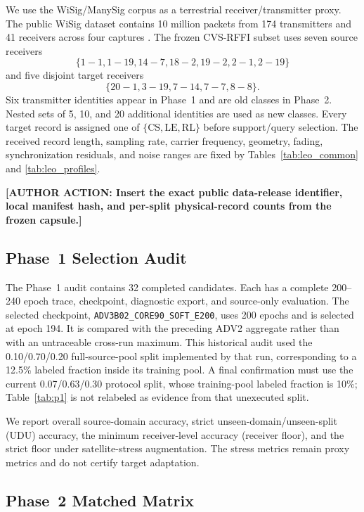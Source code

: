 \documentclass[journal]{IEEEtran}
\newcommand{\method}{CVS-RFFI}
\newcommand{\authoraction}[1]{\par\noindent\textbf{[AUTHOR ACTION: #1]}\par}
\begin{document}
We use the WiSig/ManySig corpus as a terrestrial receiver/transmitter proxy. The public WiSig dataset contains 10 million packets from 174 transmitters and 41 receivers across four captures \cite{hanna2022wisig}. The frozen \method{} subset uses seven source receivers
\[
\{1\!-\!1,1\!-\!19,14\!-\!7,18\!-\!2,19\!-\!2,2\!-\!1,2\!-\!19\}
\]
and five disjoint target receivers
\[
\{20\!-\!1,3\!-\!19,7\!-\!14,7\!-\!7,8\!-\!8\}.
\]
Six transmitter identities appear in Phase~1 and are old classes in Phase~2. Nested sets of 5, 10, and 20 additional identities are used as new classes. Every target record is assigned one of
\(\{\mathrm{CS},\mathrm{LE},\mathrm{RL}\}\) before support/query selection. The received record length, sampling rate, carrier frequency, geometry, fading, synchronization residuals, and noise ranges are fixed by Tables~\ref{tab:leo_common} and \ref{tab:leo_profiles}.

\authoraction{Insert the exact public data-release identifier, local manifest hash, and per-split physical-record counts from the frozen capsule.}

\subsection{Phase~1 Selection Audit}

The Phase~1 audit contains 32 completed candidates. Each has a complete 200--240 epoch trace, checkpoint, diagnostic export, and source-only evaluation. The selected checkpoint, \texttt{ADV3B02\_CORE90\_SOFT\_E200}, uses 200 epochs and is selected at epoch 194. It is compared with the preceding ADV2 aggregate rather than with an untraceable cross-run maximum. This historical audit used the 0.10/0.70/0.20 full-source-pool split implemented by that run, corresponding to a 12.5\% labeled fraction inside its training pool. A final confirmation must use the current 0.07/0.63/0.30 protocol split, whose training-pool labeled fraction is 10\%; Table~\ref{tab:p1} is not relabeled as evidence from that unexecuted split.

We report overall source-domain accuracy, strict unseen-domain/unseen-split (UDU) accuracy, the minimum receiver-level accuracy (receiver floor), and the strict floor under satellite-stress augmentation. The stress metrics remain proxy metrics and do not certify target adaptation.

\subsection{Phase~2 Matched Matrix}
\end{document}
